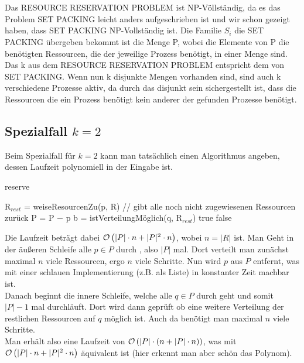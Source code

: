 \documentclass[a4paper]{article}
\begin{document}
	\maketitle
	\section{}
		\subsubsection{}
		Das RESOURCE RESERVATION PROBLEM ist NP-Völlständig, da es das Problem SET PACKING leicht anders aufgeschrieben ist und wir schon gezeigt haben, dass SET PACKING NP-Vollständig ist.	Die Familie $S_i$ die SET PACKING übergeben bekommt ist die Menge P, wobei die Elemente von P die benötigten Ressourcen, die der jeweilige Prozess benötigt, in einer Menge sind. Das k aus dem RESOURCE RESERVATION PROBLEM entspricht dem von SET PACKING. Wenn nun k disjunkte Mengen vorhanden sind, sind auch k verschiedene Prozesse aktiv, da durch das disjunkt sein sichergestellt ist, dass die Ressourcen die ein Prozess benötigt kein anderer der gefunden Prozesse benötigt.
		\subsection{Spezialfall $k=2$}
			Beim Spezialfall für $k=2$ kann man tatsächlich einen Algorithmus angeben, dessen Laufzeit polynomiell in der Eingabe ist.
		\begin{breakablealgorithm}
			\caption{reserve}
			\begin{algorithmic}[1]
						\State R$_{rest}$ = weiseResourcenZu(p, R) // gibt alle noch nicht zugewiesenen Ressourcen zurück
						\State P = P $-$ p
							\State b = istVerteilungMöglich(q, R$_{rest}$)
								\Return true
							\EndIf
						\EndFor
					\EndFor
					\Return false
				\EndProcedure
			\end{algorithmic}
		\end{breakablealgorithm}
		Die Laufzeit beträgt dabei $\mathcal{O}\left(|P|\cdot n+|P|^2\cdot n\right)$, wobei $n=|R|$ ist.\n
		Man Geht in der äußeren Schleife alle $p\in P$ durch , also $|P|$ mal. Dort verteilt man zunächst maximal $n$ viele Ressourcen, ergo $n$ viele Schritte. Nun wird $p$ aus $P$ entfernt, was mit einer schlauen Implementierung (z.B. als Liste) in konstanter Zeit machbar ist.\\
		Danach beginnt die innere Schleife, welche alle $q\in P$ durch geht und somit $|P|-1$ mal durchläuft. Dort wird dann geprüft ob eine weitere Verteilung der restlichen Ressourcen auf $q$ möglich ist. Auch da benötigt man maximal $n$ viele Schritte.\\
		Man erhält also eine Laufzeit von $\mathcal{O}\left(|P|\cdot(n+|P|\cdot n)\right)$, was mit $\mathcal{O}\left(|P|\cdot n+|P|^2\cdot n\right)$ äquivalent ist (hier erkennt man aber schön das Polynom).
\end{document}
